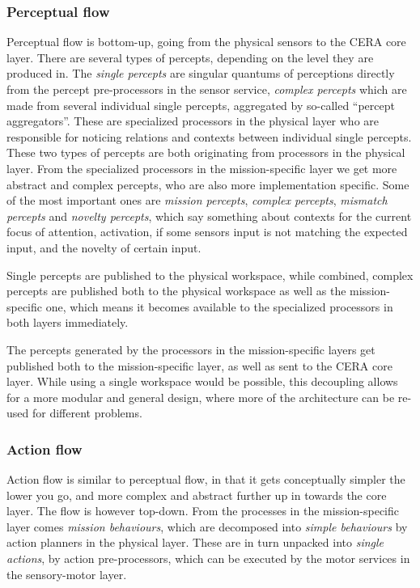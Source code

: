 \subsubsection{Perceptual flow}
Perceptual flow is bottom-up, going from the physical sensors to the CERA core
layer. There are several types of percepts, depending on the level they are
produced in. The \textit{single percepts} are singular quantums of perceptions
directly from the percept pre-processors in the sensor service, \textit{complex
percepts} which are made from several individual single percepts, aggregated by
so-called ``percept aggregators''. These are specialized processors in the
physical layer who are responsible for noticing relations and contexts between
individual single percepts. These two types of percepts are both originating
from processors in the physical layer. From the specialized processors in the
mission-specific layer we get more abstract and complex percepts, who are also
more implementation specific. Some of the most important ones are
\textit{mission percepts}, \textit{complex percepts}, \textit{mismatch
percepts} and \textit{novelty percepts}, which say something about contexts for
the current focus of attention, activation, if some sensors input is not
matching the expected input, and the novelty of certain input.

Single percepts are published to the physical workspace, while combined, complex
percepts are published both to the physical workspace as well as the
mission-specific one, which means it becomes available to the specialized
processors in both layers immediately.

The percepts generated by the processors in the mission-specific layers
get published both to the mission-specific layer, as well as sent to the CERA
core layer. While using a single workspace would be possible, this decoupling
allows for a more modular and general design, where more of the architecture
can be re-used for different problems.

\subsubsection{Action flow}
Action flow is similar to perceptual flow, in that it gets conceptually simpler
the lower you go, and more complex and abstract further up in towards the core
layer. The flow is however top-down. From the processes in the mission-specific
layer comes \textit{mission behaviours}, which are decomposed into
\textit{simple behaviours} by action planners in the physical layer. These are
in turn unpacked into \textit{single actions}, by action pre-processors, which
can be executed by the motor services in the sensory-motor layer.


